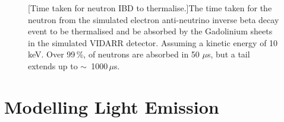 \begin{figure}[!h]
\begin{minipage}{.45\textwidth}
  [Time taken for neutron IBD to thermalise.]{The time taken for the neutron from the simulated electron anti-neutrino inverse beta decay event to be thermalised and be absorbed by the Gadolinium sheets in the simulated VIDARR detector. Assuming a kinetic energy of 10\,keV. Over 99\,\%, of neutrons are absorbed in 50 $\mu$s, but a tail extends up to $\sim$~1000\,$\mu$s.}
  \label{fig:delayedIbdTimes}
\end{minipage}
\end{figure}

\section{Modelling Light Emission}\label{sec:GEANT4Simulation_ModellingLightEmission}
